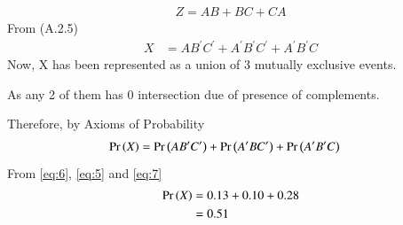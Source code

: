\documentclass[journal,12pt,twocolumn]{IEEEtran}
\begin{document}
\begin{enumerate}[label=(\alph*)]
\begin{align}
    Z=AB+BC+CA
\end{align}
From (A.2.5)
\begin{align}
    X&=AB^\prime C^\prime+A^\prime B^\prime C^\prime+A^\prime B^\prime C
\end{align}
Now, X has been represented as a union of 3 mutually exclusive events.

As any 2 of them has 0 intersection due of presence of complements.

Therefore, by Axioms of Probability
\begin{align}
    \Pr\left(X\right)&=\Pr\left(AB^\prime C^\prime\right)+\Pr\left(A^\prime BC^\prime\right)+\Pr\left(A^\prime B^\prime C\right)
\end{align}
From \eqref{eq:6}, \eqref{eq:5} and \eqref{eq:7}
\begin{align}
    \Pr\left(X\right)&=0.13+0.10+0.28\\
    &=0.51
\end{align}

\end{enumerate}
\end{document}
